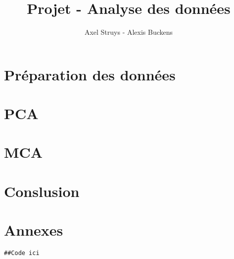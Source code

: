 \documentclass[11pt,a4paper]{article}
\author{Axel Struys - Alexis Buckens}
\title{Projet - Analyse des données}
\begin{document}
\maketitle
\section{Préparation des données}

\section{PCA}

\section{MCA}

\section{Conslusion}


\section{Annexes}

\lstset{language=R}
\begin{lstlisting}[breaklines]
##Code ici
\end{lstlisting}
\end{document}
